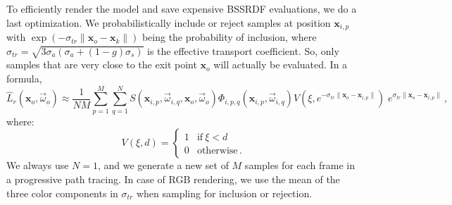 \documentclass[10pt,a4paper]{article}
\begin{document}
To efficiently render the model and save expensive BSSRDF evaluations, we do a last optimization. We probabilistically include or reject samples at position $\mathbf{x}_{i,p}$ with $\exp(-\sigma_{tr} \| \mathbf{x}_o - \mathbf{x}_k \|)$ being the probability of inclusion, where $\sigma_{tr} = \sqrt{3 \sigma_a (\sigma_a + (1-g) \sigma_s)} $ is the effective transport coefficient. So, only samples that are very close to the exit point $\mathbf{x}_o$ will actually be evaluated. In a formula,
\begin{equation*}
\hat{L}_r(\mathbf{x}_o, \vec{\omega}_o) \approx  \frac{1}{NM} \sum_{p = 1}^M \sum_{q = 1}^N S(\mathbf{x}_{i,p}, \vec{\omega}_{i,q}, \mathbf{x}_o, \vec{\omega}_o) \Phi_{i,p,q}(\mathbf{x}_{i,p}, \vec{\omega}_{i,q}) V(\xi, e^{-\sigma_{tr} \| \mathbf{x}_o - \mathbf{x}_{i,p} \|})\; e^{\sigma_{tr} \| \mathbf{x}_o - \mathbf{x}_{i,p} \|} \, ,
\end{equation*}
where:
\begin{equation*}
V(\xi, d) = \begin{cases}
1 & \text{if} \ \xi < d \\
0 & \text{otherwise} \, .
\end{cases}
\end{equation*}
We always use $N = 1$, and we generate a new set of $M$ samples for each frame in a progressive path tracing. In case of RGB rendering, we use the mean of the three color components in $\sigma_{tr}$ when sampling for inclusion or rejection.




\end{document}
